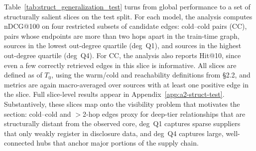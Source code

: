 \begin{table}[tbp]
\centering
\caption[\textit{Model Scorecard}]{\textit{Model Scorecard}}
\label{tab:model_scorecard}

\resizebox{\linewidth}{!}{}

  \captionsetup{justification=raggedright,singlelinecheck=false}
  \caption*{\footnotesize \textit{Note}. {Metrics are macro-averaged across 78{,}859 source nodes (each with $\geq 1$ labeled positive) on the held-out test window (2022-02-09 to 2025-06-09).
    Candidate pools use \emph{undirected two-hop} reachability with \emph{uniform} fallback to a per-source budget of 5{,}000 (seed = 42), excluding earlier positives (\textit{val}: exclude train; \textit{test}: exclude train $\cup$ val).
    Labels are positive--unlabeled, so precision-like metrics are lower bounds. ``Heuristics'' is the mean of PA/CN/AA.
    The test-set base rate (positives among candidates) is 0.132\%.
    \emph{Lift} is defined as the ensemble's global precision at a high-precision operating point (chosen on validation) divided by the base rate (here, precision $\approx 0.809$ and base rate $= 0.00132 \Rightarrow$ Lift $= 0.809 / 0.00132 \approx 612.9$). Results are averaged over five seeds (means reported in the table; 95\% CIs appear in Appendix~\ref{app:a5-seeds}).}
}
\end{table}

Table~\ref{tab:struct_generalization_test} turns from global performance to a set of structurally salient slices on the test split. For each model, the analysis computes nDCG@100 on four restricted subsets of candidate edges: cold--cold pairs (CC), pairs whose endpoints are more than two hops apart in the train-time graph, sources in the lowest out-degree quartile (deg~Q1), and sources in the highest out-degree quartile (deg~Q4). For CC, the analysis also reports Hit@10, since even a few correctly retrieved edges in this slice is informative. All slices are defined as of \(T_0\), using the warm/cold and reachability definitions from \S2.2, and metrics are again macro-averaged over sources with at least one positive edge in the slice. Full slice-level results appear in Appendix~\ref{app:a2-struct-test}. Substantively, these slices map onto the visibility problem that motivates the section: cold--cold and \(>\)2-hop edges proxy for deep-tier relationships that are structurally distant from the observed core, deg~Q1 captures sparse suppliers that only weakly register in disclosure data, and deg~Q4 captures large, well-connected hubs that anchor major portions of the supply chain.

